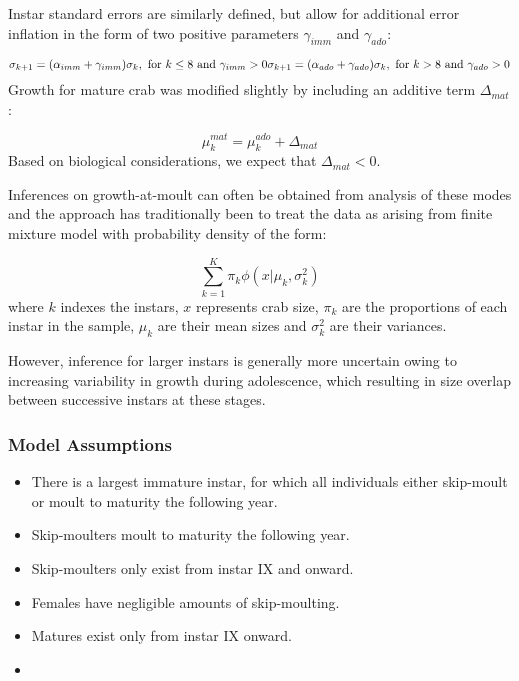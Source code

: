 \documentclass[
]{article}
\begin{document}
Instar standard errors are similarly defined, but allow for additional
error inflation in the form of two positive parameters \(\gamma_{imm}\)
and \(\gamma_{ado}\):

\[
   \sigma_{k+1} = (\alpha_{imm} + \gamma_{imm}) \sigma_{k}, \text{ for } k \le 8  \text{ and }  \gamma_{imm} > 0 \\
   \sigma_{k+1} = (\alpha_{ado} + \gamma_{ado}) \sigma_{k}, \text{ for } k > 8  \text{ and }  \gamma_{ado} > 0 \\   
\] Growth for mature crab was modified slightly by including an additive
term \(\Delta_{mat}\):

\[
   \mu_{k}^{mat} = \mu_{k}^{ado} + \Delta_{mat}
\] Based on biological considerations, we expect that
\(\Delta_{mat} < 0\).

Inferences on growth-at-moult can often be obtained from analysis of
these modes and the approach has traditionally been to treat the data as
arising from finite mixture model with probability density of the form:

\[
   \sum_{k=1}^{K} \pi_k \phi \left(x | \mu_k , \sigma_k^2  \right)
\] where \(k\) indexes the instars, \(x\) represents crab size,
\(\pi_k\) are the proportions of each instar in the sample, \(\mu_k\)
are their mean sizes and \(\sigma_k^2\) are their variances.

However, inference for larger instars is generally more uncertain owing
to increasing variability in growth during adolescence, which resulting
in size overlap between successive instars at these stages.

\hypertarget{model-assumptions}{%
\subsubsection{Model Assumptions}\label{model-assumptions}}

\begin{itemize}
\item
  There is a largest immature instar, for which all individuals either
  skip-moult or moult to maturity the following year.
\item
  Skip-moulters moult to maturity the following year.
\item
  Skip-moulters only exist from instar IX and onward.
\item
  Females have negligible amounts of skip-moulting.
\item
  Matures exist only from instar IX onward.
\item
\end{itemize}
\end{document}

